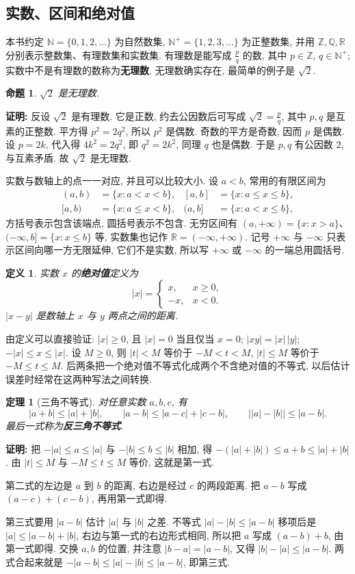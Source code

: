 \documentclass[UTF8,openany]{ctexbook}
\theoremstyle{chinesetextbook}
\newtheorem{definition}{定义}[section]
\newtheorem{theorem}{定理}[section]
\newenvironment{cnproof}{\par\indent\textbf{证明:} \ignorespaces}{\par}
\newtheorem*{propositionsingle}{命题}
\begin{document}
\subsection{实数、区间和绝对值}
本书约定 $\mathbb N=\{0,1,2,\ldots\}$ 为自然数集, $\mathbb N^+=\{1,2,3,\ldots\}$ 为正整数集, 并用 $\mathbb Z,\mathbb Q,\mathbb R$ 分别表示整数集、有理数集和实数集. 有理数是能写成 $\displaystyle\frac pq$ 的数, 其中 $p\in\mathbb Z$, $q\in\mathbb N^+$; 实数中不是有理数的数称为\textbf{无理数}. 无理数确实存在, 最简单的例子是 $\sqrt2$.
\begin{propositionsingle}
$\sqrt2$ 是无理数.
\end{propositionsingle}
\begin{cnproof}
反设 $\sqrt2$ 是有理数. 它是正数, 约去公因数后可写成 $\displaystyle\sqrt2=\frac pq$, 其中 $p,q$ 是互素的正整数. 平方得 $p^2=2q^2$, 所以 $p^2$ 是偶数. 奇数的平方是奇数, 因而 $p$ 是偶数. 设 $p=2k$, 代入得 $4k^2=2q^2$, 即 $q^2=2k^2$, 同理 $q$ 也是偶数. 于是 $p,q$ 有公因数 $2$, 与互素矛盾. 故 $\sqrt2$ 是无理数.
\end{cnproof}
实数与数轴上的点一一对应, 并且可以比较大小. 设 $a<b$, 常用的有限区间为
\[
\begin{aligned}
(a,b)&=\{x:a<x<b\},& [a,b]&=\{x:a\le x\le b\},\\
[a,b)&=\{x:a\le x<b\},& (a,b]&=\{x:a<x\le b\},
\end{aligned}
\]
方括号表示包含该端点, 圆括号表示不包含. 无穷区间有 $(a,+\infty)=\{x:x>a\}$、$(-\infty,b]=\{x:x\le b\}$ 等, 实数集也记作 $\mathbb R=(-\infty,+\infty)$. 记号 $+\infty$ 与 $-\infty$ 只表示区间向哪一方无限延伸, 它们不是实数, 所以写 $+\infty$ 或 $-\infty$ 的一端总用圆括号.
\begin{definition}
实数 $x$ 的\textbf{绝对值}定义为
\[
|x|=\begin{cases}x,&x\ge0,\\-x,&x<0.\end{cases}
\]
$|x-y|$ 是数轴上 $x$ 与 $y$ 两点之间的距离.
\end{definition}
由定义可以直接验证: $|x|\ge0$, 且 $|x|=0$ 当且仅当 $x=0$; $|xy|=|x|\,|y|$; $-|x|\le x\le|x|$. 设 $M\ge0$, 则 $|t|<M$ 等价于 $-M<t<M$, $|t|\le M$ 等价于 $-M\le t\le M$. 后两条把一个绝对值不等式化成两个不含绝对值的不等式, 以后估计误差时经常在这两种写法之间转换.
\begin{theorem}[三角不等式]
对任意实数 $a,b,c$, 有
\[
|a+b|\le|a|+|b|,\qquad |a-b|\le|a-c|+|c-b|,\qquad \bigl||a|-|b|\bigr|\le|a-b|.
\]
最后一式称为\textbf{反三角不等式}.
\end{theorem}
\begin{cnproof}
把 $-|a|\le a\le|a|$ 与 $-|b|\le b\le|b|$ 相加, 得 $-(|a|+|b|)\le a+b\le|a|+|b|$. 由 $|t|\le M$ 与 $-M\le t\le M$ 等价, 这就是第一式.

第二式的左边是 $a$ 到 $b$ 的距离, 右边是经过 $c$ 的两段距离. 把 $a-b$ 写成 $(a-c)+(c-b)$, 再用第一式即得.

第三式要用 $|a-b|$ 估计 $|a|$ 与 $|b|$ 之差. 不等式 $|a|-|b|\le|a-b|$ 移项后是 $|a|\le|a-b|+|b|$, 右边与第一式的右边形式相同, 所以把 $a$ 写成 $(a-b)+b$, 由第一式即得. 交换 $a,b$ 的位置, 并注意 $|b-a|=|a-b|$, 又得 $|b|-|a|\le|a-b|$. 两式合起来就是 $-|a-b|\le|a|-|b|\le|a-b|$, 即第三式.
\end{cnproof}
\end{document}
